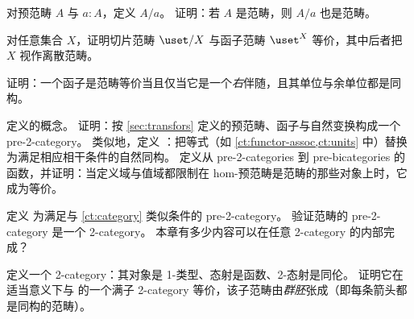 \sectionExercises

\begin{ex}\label{ex:slice-precategory}
  对预范畴 $A$ 与 $a:A$，定义 $A/a$。
  证明：若 $A$ 是范畴，则 $A/a$ 也是范畴。
\end{ex}

\begin{ex}\label{ex:set-slice-over-equiv-functor-category}
  对任意集合 $X$，证明切片范畴 $\uset/X$ 与函子范畴 $\uset^X$ 等价，其中后者把 $X$ 视作离散范畴。
\end{ex}

\begin{ex}\label{ex:functor-equiv-right-adjoint}
  证明：一个函子是范畴等价当且仅当它是一个\emph{右}伴随，且其单位与余单位都是同构。
\end{ex}

\begin{ex}\label{ct:pre2cat}
  定义的概念。
  证明：按 \cref{sec:transfors} 定义的预范畴、函子与自然变换构成一个 pre-2-category。
  类似地，定义
  ：把等式（如 \cref{ct:functor-assoc,ct:units} 中）替换为满足相应相干条件的自然同构。
  定义从 pre-2-categories 到 pre-bicategories 的函数，并证明：当定义域与值域都限制在 hom-预范畴是范畴的那些对象上时，它成为等价。
\end{ex}

\begin{ex}\label{ct:2cat}
  定义
  为满足与 \cref{ct:category} 类似条件的 pre-2-category。
  验证范畴的 pre-2-category \ucat 是一个 2-category。
  本章有多少内容可以在任意 2-category 的内部完成？
\end{ex}

\begin{ex}\label{ct:groupoids}
  定义一个 2-category：其对象是 1-类型、态射是函数、2-态射是同伦。
  证明它在适当意义下与 \ucat 的一个满子 2-category 等价，该子范畴由\emph{群胚}张成（即每条箭头都是同构的范畴）。
\end{ex}

